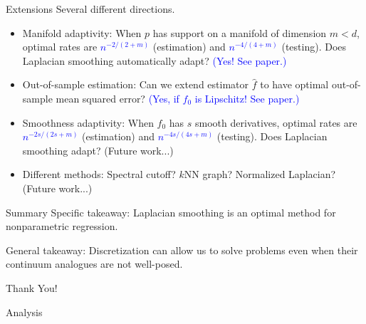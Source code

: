 \documentclass[xcolor=dvipsnames]{beamer}
\newcommand{\wh}[1]{\widehat{#1}}
\newcommand{\blue}[1]{\textcolor{blue}{#1}}
\begin{document}
\begin{frame}{Extensions}
Several different directions.
\begin{itemize}
	\item \alert{Manifold adaptivity}: When $p$ has support on a manifold of dimension $m < d$, optimal rates are \blue{$n^{-2/(2 + m)}$} (estimation) and \blue{$n^{-4/(4 + m)}$} (testing). Does Laplacian smoothing automatically adapt? \blue{(Yes! See paper.)} 
	\item \alert{Out-of-sample estimation}: Can we extend estimator $\wh{f}$ to have optimal out-of-sample mean squared error? \blue{(Yes, if $f_0$ is Lipschitz! See paper.)}
	\item \alert{Smoothness adaptivity}: When $f_0$ has $s$ smooth derivatives, optimal rates are \blue{$n^{-2s/(2s + m)}$} (estimation) and \blue{$n^{-4s/(4s + m)}$} (testing). Does Laplacian smoothing adapt? (Future work...)
	\item \alert{Different methods}: Spectral cutoff? $k$NN graph? Normalized Laplacian? (Future work...)
\end{itemize}
\end{frame}

\begin{frame}[t]{Summary}
	Specific takeaway: Laplacian smoothing is an optimal method for nonparametric regression. \newline
	
	General takeaway: Discretization can allow us to solve problems even when their continuum analogues are not well-posed.
	\newline 
	\newline
	\newline
	
	\begin{center}
	{\huge Thank You!}
	\end{center}
	
	
\end{frame}

\begin{frame}{Analysis}
\end{frame}
\end{document}
